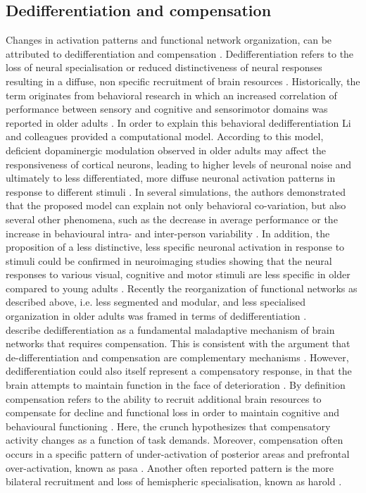 \subsection{Dedifferentiation and compensation}
\label{theory:aging:dedif}
Changes in activation patterns and functional network organization, can be attributed to dedifferentiation and compensation \cite{Grady2012}. Dedifferentiation refers to the loss of neural specialisation or reduced distinctiveness of neural responses resulting in a diffuse, non specific recruitment of brain resources \cite{Koen2019}. Historically, the term originates from behavioral research in which an increased correlation of performance between sensory and cognitive and sensorimotor domains was reported in older adults \cite{Baltes1997,Li2002}. In order to explain this behavioral dedifferentiation Li and colleagues \cite{Li2001, Li2002} provided a computational model. According to this model, deficient dopaminergic modulation observed in older adults may affect the responsiveness of cortical neurons, leading to higher levels of neuronal noise and ultimately to less differentiated, more diffuse neuronal activation patterns in response to different stimuli \cite{Li2001,Li2002}. In several simulations, the authors demonstrated that the proposed model can explain not only behavioral co-variation, but also several other phenomena, such as the decrease in average performance or the increase in behavioural intra- and inter-person variability \cite{Li2000,Li2002}. In addition, the proposition of a less distinctive, less specific neuronal activation in response to stimuli could be confirmed in neuroimaging studies showing that the neural responses to various visual, cognitive and motor stimuli are less specific in older compared to young adults \cite{Tucker2019, Koen2019,Carb2011}. Recently the reorganization of functional networks as described above, i.e. less segmented and modular, and less specialised organization in older adults was framed in terms of dedifferentiation \cite{Deery2023, Koen2019, Sala-Llonch2015}.\\
\citeauthor{Fornito2015}\cite{Fornito2015} describe dedifferentiation as a fundamental maladaptive mechanism of brain networks that requires compensation. This is consistent with the argument that de-differentiation and compensation are complementary mechanisms \cite{Reuter-Lorenz2010}. However, dedifferentiation could also itself represent a compensatory response, in that the brain attempts to maintain function in the face of deterioration \cite{Stern2009}. By definition compensation refers to the ability to recruit additional brain resources to compensate for decline and functional loss in order to maintain cognitive and behavioural functioning \cite{Reuter-Lorenz2010, Grady2012}. Here, the \gls{crunch} hypothesizes that compensatory activity changes as a function of task demands. Moreover, compensation often occurs in a specific pattern of under-activation of posterior areas and prefrontal over-activation, known as \gls{pasa} \cite{Davis2007}. Another often reported pattern is the more bilateral recruitment and loss of hemispheric specialisation, known as \gls{harold} \cite{Cabeza2002}.

